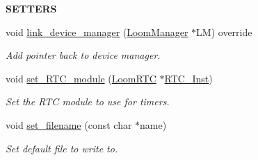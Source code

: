 \begin{Indent}{\bf S\+E\+T\+T\+E\+RS}\par
\begin{DoxyCompactItemize}
\item 
void \hyperlink{class_loom___s_d_ad910296dd33bec7d3ec8a91892aade48}{link\+\_\+device\+\_\+manager} (\hyperlink{class_loom_manager}{Loom\+Manager} $\ast$LM) override
\begin{DoxyCompactList}\small\item\em Add pointer back to device manager. \end{DoxyCompactList}\item 
void \hyperlink{class_loom___s_d_a8704546681d123363d8210ac0c95f293}{set\+\_\+\+R\+T\+C\+\_\+module} (\hyperlink{class_loom_r_t_c}{Loom\+R\+TC} $\ast$\hyperlink{class_loom___s_d_a3dcce942e87eabc4e3912d1af283618c}{R\+T\+C\+\_\+\+Inst})
\begin{DoxyCompactList}\small\item\em Set the R\+TC module to use for timers. \end{DoxyCompactList}\item 
void \hyperlink{class_loom___s_d_a58416c209f76a591bf85e824240a7659}{set\+\_\+filename} (const char $\ast$name)
\begin{DoxyCompactList}\small\item\em Set default file to write to. \end{DoxyCompactList}\end{DoxyCompactItemize}
\end{Indent}
